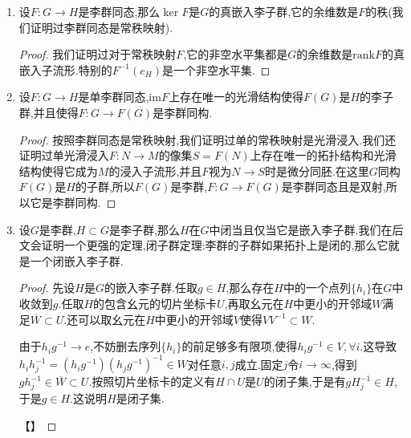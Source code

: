 \begin{enumerate}
\begin{proof}
    	如果$W$还是连通的,那么$W^{-1}$也是连通的,并且这两个集合都包含了幺元,我们知道交非空的两个连通子集的并也是连通的,于是$W_1=W\cup W^{-1}$是连通的.记群二元运算映射为$m:G\times G\to G$,那么$W_k=m(W_1\times W_{k-1})$,对$k$归纳结合连通空间的连续像是连通的,就得到每个$W_k$都是连通的,于是$H=\cup_kW_k$也是连通的.
    	
    	最后如果$G$本身是连通的,我们解释过$H$是开子群的时候也是闭子群,连通性就保证$H=G$.
    \end{proof}
    \item 设$F:G\to H$是李群同态,那么$\ker F$是$G$的真嵌入李子群,它的余维数是$F$的秩(我们证明过李群同态是常秩映射).
    \begin{proof}
    	
    	我们证明过对于常秩映射$F$,它的非空水平集都是$G$的余维数是$\mathrm{rank}F$的真嵌入子流形.特别的$F^{-1}(e_H)$是一个非空水平集.
    \end{proof}
    \item 设$F:G\to H$是单李群同态,$\mathrm{im}F$上存在唯一的光滑结构使得$F(G)$是$H$的李子群,并且使得$F:G\to F(G)$是李群同构.
    \begin{proof}
    	
    	按照李群同态是常秩映射,我们证明过单的常秩映射是光滑浸入.我们还证明过单光滑浸入$F:N\to M$的像集$S=F(N)$上存在唯一的拓扑结构和光滑结构使得它成为$M$的浸入子流形,并且$F$视为$N\to S$时是微分同胚.在这里$G$同构$F(G)$是$H$的子群,所以$F(G)$是李群,$F:G\to F(G)$是李群同态且是双射,所以它是李群同构.
    \end{proof}
    \item 设$G$是李群,$H\subset G$是李子群,那么$H$在$G$中闭当且仅当它是嵌入李子群.我们在后文会证明一个更强的定理,闭子群定理:李群的子群如果拓扑上是闭的,那么它就是一个闭嵌入李子群.
    \begin{proof}
    	
    	先设$H$是$G$的嵌入李子群.任取$g\in\overline{H}$,那么存在$H$中的一个点列$\{h_i\}$在$G$中收敛到$g$.任取$H$的包含幺元的切片坐标卡$U$,再取幺元在$H$中更小的开邻域$W$满足$\overline{W}\subset U$.还可以取幺元在$H$中更小的开邻域$V$使得$VV^{-1}\subset W$.
    	
    	由于$h_ig^{-1}\to e$,不妨删去序列$\{h_i\}$的前足够多有限项,使得$h_ig^{-1}\in V,\forall i$.这导致$h_ih_j^{-1}=(h_ig^{-1})(h_jg^{-1})^{-1}\in W$对任意$i,j$成立.固定$j$令$i\to\infty$,得到$gh_j^{-1}\in\overline{W}\subset U$.按照切片坐标卡的定义有$H\cap U$是$U$的闭子集,于是有$gH_j^{-1}\in H$,于是$g\in H$.这说明$H$是闭子集.
    	
    	【】
    \end{proof}
\end{enumerate}

